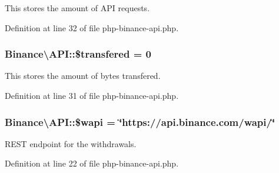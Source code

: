 This stores the amount of A\-P\-I requests. 



Definition at line 32 of file php-\/binance-\/api.\-php.

\hypertarget{classBinance_1_1API_ac40776b871ae1591348c96162e872789}{
\subsubsection[{\$transfered}]{\setlength{\rightskip}{0pt plus 5cm}Binance\textbackslash{}\-A\-P\-I\-::\$transfered = 0\hspace{0.3cm}{\ttfamily [protected]}}}\label{classBinance_1_1API_ac40776b871ae1591348c96162e872789}


This stores the amount of bytes transfered. 



Definition at line 31 of file php-\/binance-\/api.\-php.

\hypertarget{classBinance_1_1API_a52a5376574ff759fb1df6c8efe24cb7f}{
\subsubsection[{\$wapi}]{\setlength{\rightskip}{0pt plus 5cm}Binance\textbackslash{}\-A\-P\-I\-::\$wapi = \char`\"{}https\-://api.\-binance.\-com/wapi/\char`\"{}\hspace{0.3cm}{\ttfamily [protected]}}}\label{classBinance_1_1API_a52a5376574ff759fb1df6c8efe24cb7f}


R\-E\-S\-T endpoint for the withdrawals. 



Definition at line 22 of file php-\/binance-\/api.\-php.

